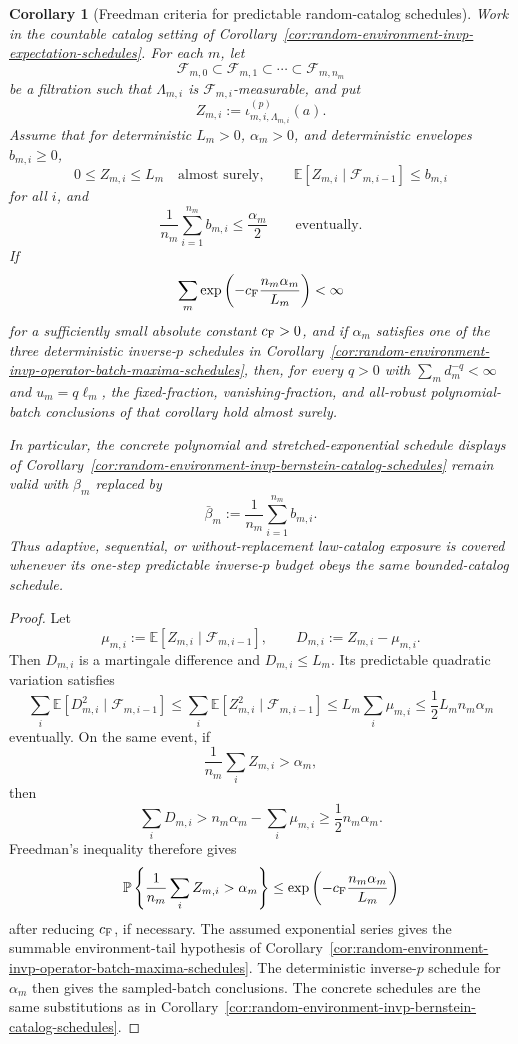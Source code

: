 \documentclass[11pt]{amsart}
\numberwithin{equation}{section}
\newtheorem{corollary}[theorem]{Corollary}
\theoremstyle{definition}
\theoremstyle{remark}
\newcommand{\Prob}{\mathbb P}
\newcommand{\Exp}{\mathbb E}
\begin{document}
\begin{corollary}[Freedman criteria for predictable random-catalog schedules]
\label{cor:random-environment-invp-freedman-catalog-schedules}
Work in the countable catalog setting of
Corollary~\ref{cor:random-environment-invp-expectation-schedules}.  For each
\(m\), let
\[
  \mathcal F_{m,0}\subset\mathcal F_{m,1}\subset\cdots
  \subset\mathcal F_{m,n_m}
\]
be a filtration such that \(\Lambda_{m,i}\) is \(\mathcal F_{m,i}\)-measurable,
and put
\[
  Z_{m,i}:=\iota_{m,i,\Lambda_{m,i}}^{(p)}(a).
\]
Assume that for deterministic \(L_m>0\), \(\alpha_m>0\), and deterministic
envelopes \(b_{m,i}\ge0\),
\[
  0\le Z_{m,i}\le L_m\quad\text{almost surely},
  \qquad
  \Exp[Z_{m,i}\mid\mathcal F_{m,i-1}]\le b_{m,i}
\]
for all \(i\), and
\[
  \frac1{n_m}\sum_{i=1}^{n_m}b_{m,i}\le \frac{\alpha_m}{2}
  \qquad\text{eventually}.
\]
If
\[
  \sum_m \exp\left(-c_{\rm F}\frac{n_m\alpha_m}{L_m}\right)<\infty
\]
for a sufficiently small absolute constant \(c_{\rm F}>0\), and if
\(\alpha_m\) satisfies one of the three deterministic inverse-\(p\) schedules in
Corollary~\ref{cor:random-environment-invp-operator-batch-maxima-schedules},
then, for every \(q>0\) with \(\sum_m d_m^{-q}<\infty\) and \(u_m=q\ell_m\),
the fixed-fraction, vanishing-fraction, and all-robust polynomial-batch
conclusions of that corollary hold almost surely.

In particular, the concrete polynomial and stretched-exponential schedule
displays of
Corollary~\ref{cor:random-environment-invp-bernstein-catalog-schedules} remain
valid with \(\beta_m\) replaced by
\[
  \bar\beta_m:=\frac1{n_m}\sum_{i=1}^{n_m}b_{m,i}.
\]
Thus adaptive, sequential, or without-replacement law-catalog exposure is
covered whenever its one-step predictable inverse-\(p\) budget obeys the same
bounded-catalog schedule.
\end{corollary}

\begin{proof}
Let
\[
  \mu_{m,i}:=\Exp[Z_{m,i}\mid\mathcal F_{m,i-1}],
  \qquad
  D_{m,i}:=Z_{m,i}-\mu_{m,i}.
\]
Then \(D_{m,i}\) is a martingale difference and \(D_{m,i}\le L_m\).  Its
predictable quadratic variation satisfies
\[
  \sum_i\Exp[D_{m,i}^2\mid\mathcal F_{m,i-1}]
  \le \sum_i\Exp[Z_{m,i}^2\mid\mathcal F_{m,i-1}]
  \le L_m\sum_i\mu_{m,i}
  \le \frac12 L_m n_m\alpha_m
\]
eventually.  On the same event, if
\[
  \frac1{n_m}\sum_i Z_{m,i}>\alpha_m,
\]
then
\[
  \sum_i D_{m,i}>
  n_m\alpha_m-\sum_i\mu_{m,i}
  \ge \frac12 n_m\alpha_m .
\]
Freedman's inequality therefore gives
\[
  \Prob\left\{\frac1{n_m}\sum_i Z_{m,i}>\alpha_m\right\}
  \le
  \exp\left(-c_{\rm F}\frac{n_m\alpha_m}{L_m}\right)
\]
after reducing \(c_{\rm F}\), if necessary.  The assumed exponential series
gives the summable environment-tail hypothesis of
Corollary~\ref{cor:random-environment-invp-operator-batch-maxima-schedules}.
The deterministic inverse-\(p\) schedule for \(\alpha_m\) then gives the
sampled-batch conclusions.  The concrete schedules are the same substitutions
as in Corollary~\ref{cor:random-environment-invp-bernstein-catalog-schedules}.
\end{proof}
\end{document}
